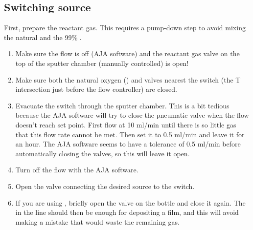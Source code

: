 \subsection{Switching  source}
First, prepare the reactant gas. This requires a pump-down step to avoid mixing the natural  and the 99\% .
\begin{enumerate}
	\item Make sure the flow is off (AJA software) and the reactant gas valve on the top of the sputter chamber (manually controlled) is open!
	
	\item Make sure both the natural oxygen () and  valves nearest the switch (the T intersection just before the flow controller) are closed.
	
	\item Evacuate the switch through the sputter chamber. This is a bit tedious because the AJA software will try to close the pneumatic valve when the flow doesn't reach set point. First flow at 10 ml/min until there is so little gas that this flow rate cannot be met. Then set it to 0.5 ml/min and leave it for an hour. The AJA software seems to have a tolerance of 0.5 ml/min before automatically closing the valves, so this will leave it open.
	
	\item Turn off the flow with the AJA software.
	
	\item Open the valve connecting the desired  source to the switch. 
	
	\item If you are using , briefly open the valve on the bottle and close it again. The  in the line should then be enough for depositing a film, and this will avoid making a mistake that would waste the remaining gas.
\end{enumerate}


